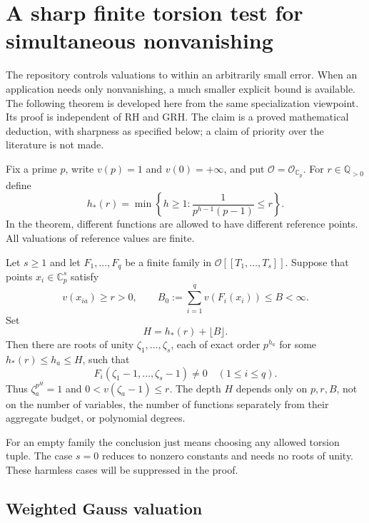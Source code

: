 \section{A sharp finite torsion test for simultaneous nonvanishing}
\label{sec:sharp}

The repository controls valuations to within an arbitrarily small error. When
an application needs only nonvanishing, a much smaller explicit bound is
available. The following theorem is developed here from the same
specialization viewpoint. Its proof is independent of RH and GRH. The claim
is a proved mathematical deduction, with sharpness as specified below; a
claim of priority over the literature is not made.

Fix a prime $p$, write $v(p)=1$ and $v(0)=+\infty$, and put
$\mathcal O=\mathcal O_{\mathbb C_p}$. For $r\in\mathbb Q_{>0}$ define
\begin{equation}
 h_*(r)=\min\left\{h\geq1:
       \frac1{p^{h-1}(p-1)}\leq r\right\}.
 \label{eq:hstar}
\end{equation}
In the theorem, different functions are allowed to have different reference
points. All valuations of reference values are finite.

\begin{theorem}
\label{thm:sharp-nonvanishing}
Let $s\geq1$ and let $F_1,\ldots,F_q$ be a finite family in
$\mathcal O[[T_1,\ldots,T_s]]$. Suppose that points
$x_i\in\mathbb C_p^s$ satisfy
\[
 v(x_{ia})\geq r>0,\qquad
 B_0:=\sum_{i=1}^q v(F_i(x_i))\leq B<\infty.
\]
Set
\begin{equation}
 H=h_*(r)+\lfloor B\rfloor.
 \label{eq:linear-H}
\end{equation}
Then there are roots of unity $\zeta_1,\ldots,\zeta_s$, each of exact
order $p^{h_a}$ for some $h_*(r)\leq h_a\leq H$, such that
\[
 F_i(\zeta_1-1,\ldots,\zeta_s-1)\ne0\quad(1\leq i\leq q).
\]
Thus $\zeta_a^{p^H}=1$ and $0<v(\zeta_a-1)\leq r$. The depth $H$
depends only on $p,r,B$, not on the number of variables, the number of
functions separately from their aggregate budget, or polynomial degrees.
\end{theorem}

For an empty family the conclusion just means choosing any allowed torsion
tuple. The case $s=0$ reduces to nonzero constants and needs no roots of
unity. These harmless cases will be suppressed in the proof.

\subsection{Weighted Gauss valuation}

